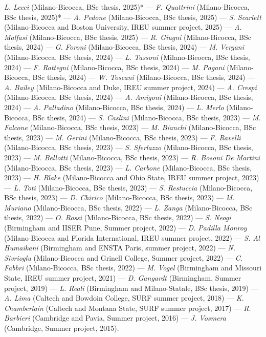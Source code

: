 \textit{L. Lecci} (Milano-Bicocca, BSc thesis, 2025)* --- 
\textit{F. Quattrini} (Milano-Bicocca, BSc thesis, 2025)* --- 
\textit{A. Pedone} (Milano-Bicocca, BSc thesis, 2025) --- 
\textit{S. Scarlett} (Milano-Bicocca and Boston University, IREU summer project, 2025) --- 
\textit{A. Malfasi} (Milano-Bicocca, BSc thesis, 2025) --- 
\textit{R. Giugni} (Milano-Bicocca, BSc thesis, 2024) --- 
\textit{G. Foroni} (Milano-Bicocca, BSc thesis, 2024) --- 
\textit{M. Vergani} (Milano-Bicocca, BSc thesis, 2024) --- 
\textit{L. Tassoni} (Milano-Bicocca, BSc thesis, 2024) --- 
\textit{F. Rattegni} (Milano-Bicocca, BSc thesis, 2024) --- 
\textit{M. Pagani} (Milano-Bicocca, BSc thesis, 2024) --- 
\textit{W. Toscani} (Milano-Bicocca, BSc thesis, 2024) --- 
\textit{A. Bailey} (Milano-Bicocca and Duke, IREU summer project, 2024) --- 
\textit{A. Crespi} (Milano-Bicocca, BSc thesis, 2024) --- 
\textit{A. Amigoni} (Milano-Bicocca, BSc thesis, 2024) --- 
\textit{A. Palladino} (Milano-Bicocca, BSc thesis, 2024) --- 
\textit{L. Merlo} (Milano-Bicocca, BSc thesis, 2024) --- 
\textit{S. Caslini} (Milano-Bicocca, BSc thesis, 2023) --- 
\textit{M. Falcone} (Milano-Bicocca, BSc thesis, 2023) --- 
\textit{M. Bianchi} (Milano-Bicocca, BSc thesis, 2023) --- 
\textit{M. Gerini} (Milano-Bicocca, BSc thesis, 2023) --- 
\textit{F. Ravelli} (Milano-Bicocca, BSc thesis, 2023) --- 
\textit{S. Sferlazzo} (Milano-Bicocca, BSc thesis, 2023) --- 
\textit{M. Bellotti} (Milano-Bicocca, BSc thesis, 2023) --- 
\textit{R. Bosoni De Martini} (Milano-Bicocca, BSc thesis, 2023) --- 
\textit{L. Carbone} (Milano-Bicocca, BSc thesis, 2023) --- 
\textit{H. Blake} (Milano-Bicocca and Ohio State, IREU summer project, 2023) --- 
\textit{L. Toti} (Milano-Bicocca, BSc thesis, 2023) --- 
\textit{S. Restuccia} (Milano-Bicocca, BSc thesis, 2023) --- 
\textit{D. Chirico} (Milano-Bicocca, BSc thesis, 2023) --- 
\textit{M. Muriano} (Milano-Bicocca, BSc thesis, 2022) --- 
\textit{L. Zanga} (Milano-Bicocca, BSc thesis, 2022) --- 
\textit{O. Rossi} (Milano-Bicocca, BSc thesis, 2022) --- 
\textit{S. Neogi} (Birmingham and IISER Pune, Summer project, 2022) --- 
\textit{D. Padilla Monroy} (Milano-Bicocca and Florida International, IREU summer project, 2022) --- 
\textit{S. Al Humaikani} (Birmingham and ENSTA Paris, summer project, 2022) --- 
\textit{N. Sivrioglu} (Milano-Bicocca and Grinell College, Summer project, 2022) --- 
\textit{C. Fabbri} (Milano-Bicocca, BSc thesis, 2022) --- 
\textit{M. Vogel} (Birmingham and Missouri State, IREU summer project, 2021) --- 
\textit{D. Gangardt} (Birmingham, Summer project, 2019) --- 
\textit{L. Reali} (Birmingham and Milano-Statale, BSc thesis, 2019) --- 
\textit{A. Lima} (Caltech and Bowdoin College, SURF summer project, 2018) --- 
\textit{K. Chamberlain} (Caltech and Montana State, SURF summer project, 2017) --- 
\textit{R. Barbieri} (Cambridge and Pavia, Summer project, 2016) --- 
\textit{J. Vosmera} (Cambridge, Summer project, 2015).